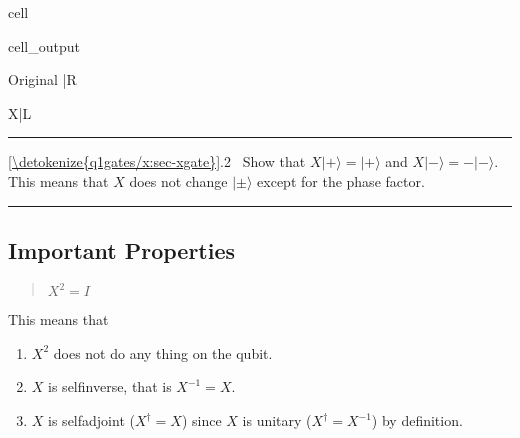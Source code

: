\documentclass[letterpaper,10pt,english]{jupyterBook}
\begin{document}
\begin{sphinxuseclass}{cell}
\begin{sphinxVerbatimOutput}
\begin{sphinxuseclass}{cell_output}
\begin{sphinxVerbatim}[commandchars=\\\{\}]
\PYGZsq{}Original |R\PYGZgt{}\PYGZsq{}
\end{sphinxVerbatim}

\noindent{}

\begin{sphinxVerbatim}[commandchars=\\\{\}]
\PYGZsq{}X|L\PYGZgt{}\PYGZsq{}
\end{sphinxVerbatim}

\noindent{}

\end{sphinxuseclass}\end{sphinxVerbatimOutput}

\end{sphinxuseclass}

\bigskip\hrule\bigskip


\sphinxAtStartPar
{} \hyperref[\detokenize{q1gates/x:sec-xgate}]{\ref{\detokenize{q1gates/x:sec-xgate}}}.2   Show that \(X|+\rangle = |+\rangle\) and \(X|-\rangle = -|-\rangle\).  This means that \(X\) does not change \(|\pm\rangle\) except for the phase factor.


\bigskip\hrule\bigskip



\subsection{Important Properties}
\label{\detokenize{q1gates/x:important-properties}}\begin{quote}

\sphinxAtStartPar
\(X^2 = I\)
\end{quote}

\sphinxAtStartPar
This means that
\begin{enumerate}
%
\item {}
\sphinxAtStartPar
\(X^2\) does not do any thing on the qubit.

\item {}
\sphinxAtStartPar
\(X\) is  self\sphinxhyphen{}inverse, that is \(X^{-1} = X\).

\item {}
\sphinxAtStartPar
\(X\) is self\sphinxhyphen{}adjoint (\(X^\dagger = X\)) since \(X\) is unitary (\(X^\dagger = X^{-1}\)) by definition.

\end{enumerate}
\end{document}
